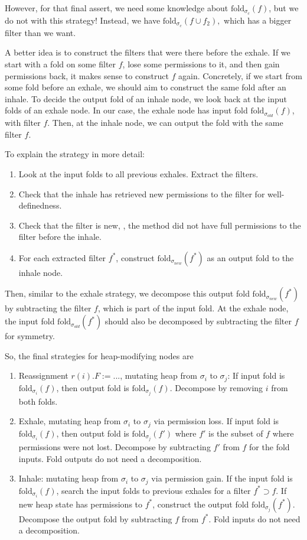 \documentclass[msc,oneside]{ubcthesis}
\theoremstyle{definition}
\begin{document}
However, for that final assert, we need some knowledge about $\textrm{fold}_{\sigma_{c}}(f)$, but we do not with this strategy! Instead, we have $\textrm{fold}_{\sigma_{c}}(f \cup f_2 ),$ which has a bigger filter than we want.

A better idea is to construct the filters that were there before the exhale. If we start with a fold on some filter $f$, lose some permissions to it, and then gain permissions back, it makes sense to construct $f$ again. Concretely, if we start from some fold before an exhale, we should aim to construct the same fold after an inhale. To decide the output fold of an inhale node, we look back at the input folds of an exhale node. In our case, the exhale node has input fold $\textrm{fold}_{\sigma_{old}}(f)$, with filter $f$. Then, at the inhale node, we can output the fold with the same filter $f$.

To explain the strategy in more detail:
\begin{enumerate}
    \item Look at the input folds to all previous exhales. Extract the filters.
    \item Check that the inhale has retrieved new permissions to the filter for well-definedness. 
    \item Check that the filter is new, \ie, the method did not have full permissions to the filter before the inhale. 
    \item For each extracted filter $f^*$, construct $\textrm{fold}_{\sigma_{new}}(f^*)$ as an output fold to the inhale node.
\end{enumerate}

Then, similar to the exhale strategy, we decompose this output fold $\textrm{fold}_{\sigma_{new}}(f^*)$ by subtracting the filter $f$, which is part of the input fold. At the exhale node, the input fold $\textrm{fold}_{\sigma_{old}}(f^*)$ should also be decomposed by subtracting the filter $f$ for symmetry. 

So, the final strategies for heap-modifying nodes are
\begin{enumerate} \label{strat:final}
    \item Reassignment $r(i).F := ...$, mutating heap from $\sigma_i$ to $\sigma_j$: 
    If input fold is $\textrm{fold}_{\sigma_i}(f)$, then output fold is $\textrm{fold}_{\sigma_j}(f)$. 
    Decompose by removing $i$ from both folds.
    \item Exhale, mutating heap from $\sigma_i$ to $\sigma_j$ via permission loss. If input fold is $\textrm{fold}_{\sigma_i}(f)$, then output fold is $\textrm{fold}_{\sigma_j}(f')$ where $f'$ is the subset of $f$ where permissions were not lost. Decompose by subtracting $f'$ from $f$ for the fold inputs. Fold outputs do not need a decomposition.
    \item Inhale: mutating heap from $\sigma_i$ to $\sigma_j$ via permission gain. If the input fold is $\textrm{fold}_{\sigma_i}(f)$, search the input folds to previous exhales for a filter $f^* \supset f$. If new heap state has permissions to $f^*$, construct the output fold $\textrm{fold}_{\sigma_j}(f^*)$. Decompose the output fold by subtracting $f$ from $f^*$. Fold inputs do not need a decomposition.
\end{enumerate}
\end{document}
